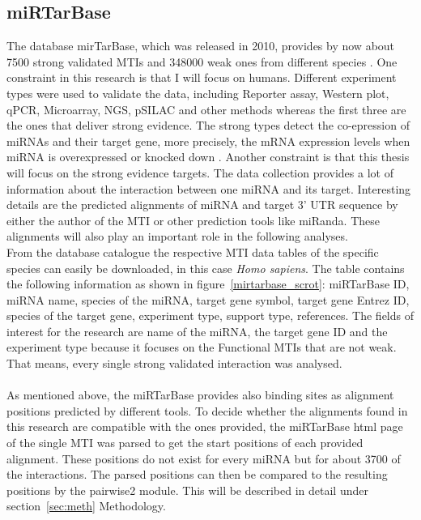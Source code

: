\documentclass[11pt, a4paper, twoside]{book}
\begin{document}
\subsection{miRTarBase}
The database mirTarBase, which was released in 2010, provides by now about 7500 strong validated MTIs and 348000 weak ones from different species \cite{Chou}. One constraint in this research is that I will focus on humans. Different experiment types were used to validate the data, including Reporter assay, Western plot, qPCR, Microarray, NGS, pSILAC and other methods whereas the first three are the ones that deliver strong evidence. The strong types detect the co-epression of miRNAs and their target gene, more precisely, the mRNA expression levels when miRNA is overexpressed or knocked down  \cite{Hsu}. Another constraint is that this thesis will focus on the strong evidence targets. The data collection provides a lot of information about the interaction between one miRNA and its target. Interesting details are the predicted alignments of miRNA and target 3' UTR sequence by either the author of the MTI or other prediction tools like miRanda. These alignments will also play an important role in the following analyses. \\

From the database catalogue the respective MTI data tables of the specific species can easily be downloaded, in this case \textit{Homo sapiens}. The table contains the following information as shown in figure~\ref{mirtarbase_scrot}: miRTarBase ID, miRNA name, species of the miRNA, target gene symbol, target gene Entrez ID, species of the target gene, experiment type, support type, references. The fields of interest for the research are name of the miRNA, the target gene ID and the experiment type because it focuses on the Functional MTIs that are not weak. That means, every single strong validated interaction was analysed.\\\\

As mentioned above, the miRTarBase provides also binding sites as alignment positions predicted by different tools. To decide whether the alignments found in this research are compatible with the ones provided, the miRTarBase html page of the single MTI was parsed to get the start positions of each provided alignment. These positions do not exist for every miRNA but for about 3700 of the interactions. The parsed positions can then be compared to the resulting positions by the pairwise2 module. This will be described in detail under section~\ref{sec:meth} Methodology.\\ 
\end{document}
